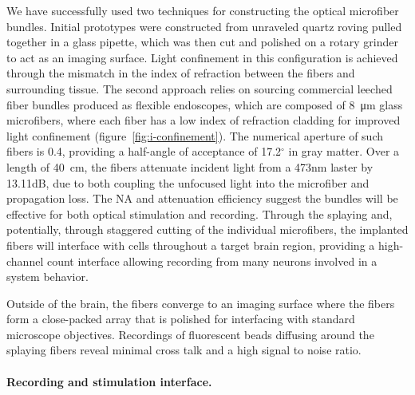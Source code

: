 We have successfully used two techniques for constructing the optical microfiber bundles. Initial prototypes were
constructed from unraveled quartz roving pulled together in a glass pipette, which was then cut and polished on 
a rotary grinder to act as an imaging surface. Light confinement in this configuration is achieved through the 
mismatch in the index of refraction between the fibers and surrounding tissue. The second approach relies on sourcing 
commercial leeched fiber bundles produced as flexible endoscopes, which are composed of 8~\si{\micro\meter} glass microfibers, 
where each fiber has a low index of refraction cladding for improved light confinement (figure~\ref{fig:i-confinement}).
The numerical aperture of such fibers is 0.4, providing a half-angle of acceptance of 17.2$^{\circ}$ in gray matter.
Over a length of 40~\si{\centi\meter}, the fibers attenuate incident light from a 473nm laster by 13.11dB, due to both coupling the 
unfocused light into the microfiber and propagation loss. The NA and attenuation efficiency suggest the bundles will
be effective for both optical stimulation and recording. Through 
the splaying and, potentially, through staggered cutting of the individual microfibers, the implanted
fibers will interface with cells throughout a target brain region, providing a high-channel count interface
allowing recording from many neurons involved in a system behavior.

Outside of the brain, the fibers converge to an imaging surface where the fibers form a close-packed array that
is polished for interfacing with standard microscope objectives. Recordings of fluorescent beads diffusing around the
splaying fibers reveal minimal cross talk and a high signal to noise ratio.


\paragraph{Recording and stimulation interface.}


